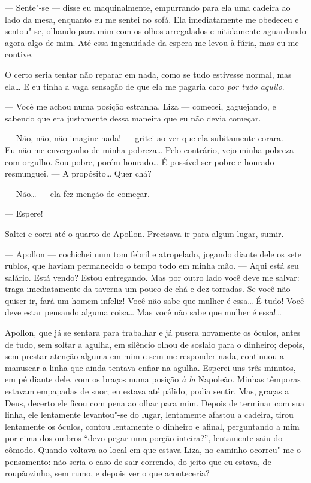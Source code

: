 --- Sente"-se --- disse eu maquinalmente, empurrando para ela uma cadeira ao
lado da mesa, enquanto eu me sentei no sofá. Ela imediatamente me
obedeceu e sentou"-se, olhando para mim com os olhos arregalados e
nitidamente aguardando agora algo de mim. Até essa ingenuidade da
espera me levou à fúria, mas eu me contive.

O certo seria tentar não reparar em nada, como se tudo estivesse normal,
mas ela\ldots{} E eu tinha a vaga sensação de que ela me pagaria caro
\textit{por tudo aquilo}.

--- Você me achou numa posição estranha, Liza --- comecei, gaguejando, e
sabendo que era justamente dessa maneira que eu não devia começar.

--- Não, não, não imagine nada! --- gritei ao ver que ela subitamente
corara. --- Eu não me envergonho de minha pobreza\ldots{} Pelo contrário, vejo
minha pobreza com orgulho. Sou pobre, porém honrado\ldots{} É possível ser
pobre e honrado --- resmunguei. --- A propósito\ldots{} Quer chá?

--- Não\ldots{} --- ela fez menção de começar.

--- Espere!

Saltei e corri até o quarto de Apollon. Precisava ir para algum lugar,
sumir.

--- Apollon --- cochichei num tom febril e atropelado, jogando diante dele
os sete rublos, que haviam permanecido o tempo todo em minha mão. ---
Aqui está seu salário. Está vendo? Estou entregando. Mas por outro lado
você deve me salvar: traga imediatamente da taverna um pouco de chá e
dez torradas. Se você não quiser ir, fará um homem infeliz! Você não
sabe que mulher é essa\ldots{} É tudo! Você deve estar pensando alguma
coisa\ldots{} Mas você não sabe que mulher é essa!\ldots{}

Apollon, que já se sentara para trabalhar e já pusera novamente os
óculos, antes de tudo, sem soltar a agulha, em silêncio olhou de
soslaio para o dinheiro; depois, sem prestar atenção alguma em mim e
sem me responder nada, continuou a manusear a linha que ainda tentava
enfiar na agulha. Esperei uns três minutos, em pé diante dele, com os
braços numa posição \textit{à la} Napoleão. Minhas
têmporas estavam empapadas de suor; eu estava até pálido, podia sentir.
Mas, graças a Deus, decerto ele ficou com pena ao olhar para mim.
Depois de terminar com sua linha, ele lentamente levantou"-se do lugar,
lentamente afastou a cadeira, tirou lentamente os óculos, contou
lentamente o dinheiro e afinal, perguntando a mim por cima dos
ombros ``devo pegar uma porção inteira?'', lentamente saiu do cômodo.
Quando voltava ao local em que estava Liza, no caminho ocorreu"-me o
pensamento: não seria o caso de sair correndo, do jeito que eu estava,
de roupãozinho, sem rumo, e depois ver o que aconteceria?

